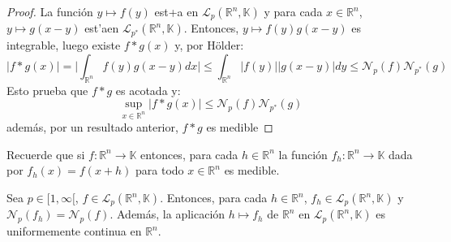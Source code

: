 \documentclass[12pt]{report}
\theoremstyle{largebreak}
\newcommand\cf[3]{\ensuremath{#1:#2\rightarrow#3}}
\newcommand\abs[1]{\ensuremath{\big|#1\big|}}
\newcommand{\N}[2]{\ensuremath{\mathcal{N}_{#1}\left(#2\right)}}
\begin{document}
    \begin{proof}
        La función $y\mapsto f(y)$ est+a en $\mathcal{L}_p(\mathbb{R}^n,\mathbb{K})$ y para cada $x\in\mathbb{R}^n$, $y\mapsto g(x-y)$ est'aen $\mathcal{L}_{ p^*}(\mathbb{R}^n,\mathbb{K})$. Entonces, $y\mapsto f(y)g(x-y)$ es integrable, luego existe $f*g(x)$ y, por Hölder:
        \begin{equation*}
            \abs{f*g(x)}=\abs{\int_{\mathbb{R}^n}f(y)g(x-y)dx}\leq\int_{\mathbb{R}^n}\abs{f(y)}\abs{g(x-y)}dy\leq\N{p}{f}\N{p^*}{g}
        \end{equation*}
        Esto prueba que $f*g$ es acotada y:
        \begin{equation*}
            \sup_{x\in\mathbb{R}^n}\abs{f*g(x)}\leq\N{p}{f}\N{p^*}{g}
        \end{equation*}
        además, por un resultado anterior, $f*g$ es medible
    \end{proof}

    \begin{obs}
        Recuerde que si $\cf{f}{\mathbb{R}^n}{\mathbb{K}}$ entonces, para cada $h\in\mathbb{R}^n$ la función $\cf{f_h}{\mathbb{R}^n}{\mathbb{K}}$ dada por $f_h(x)=f(x+h)$ para todo $x\in\mathbb{R}^n$ es medible.
    \end{obs}

    \begin{lema}
        Sea $p\in[1,\infty[$, $f\in\mathcal{L}_p(\mathbb{R}^n,\mathbb{K})$. Entonces, para cada $h\in\mathbb{R}^n$, $f_h\in\mathcal{L}_p(\mathbb{R}^n,\mathbb{K})$ y $\N{p}{f_h}=\N{p}{f}$. Además, la aplicación $h\mapsto f_h$ de $\mathbb{R}^n$ en $\mathcal{L}_p(\mathbb{R}^n,\mathbb{K})$ es uniformemente continua en $\mathbb{R}^n$.
    \end{lema}
\end{document}

